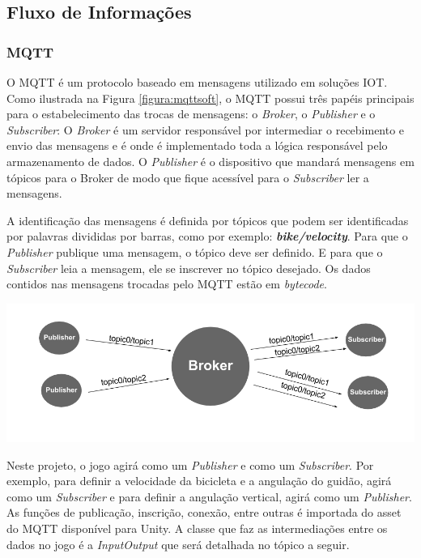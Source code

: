\subsection{Fluxo de Informa\c{c}ões}
\subsubsection{MQTT}

O MQTT é um protocolo baseado em mensagens utilizado em soluções IOT. Como ilustrada na Figura \ref{figura:mqttsoft}, o MQTT possui três papéis principais para o estabelecimento das trocas de mensagens: o \textit{Broker}, o \textit{Publisher} e o \textit{Subscriber}: O \textit{Broker} é um servidor responsável por intermediar o recebimento e envio das mensagens e é onde é implementado toda a lógica responsável pelo armazenamento de dados. O \textit{Publisher} é o dispositivo que mandará mensagens em tópicos para o Broker de modo que fique acessível para o \textit{Subscriber} ler a mensagens.

A identificação das mensagens é definida por tópicos que podem ser identificadas por palavras divididas por barras, como por exemplo: \textit{\textbf{bike/velocity}}. Para que o \textit{Publisher} publique uma mensagem, o tópico deve ser definido. E para que o \textit{Subscriber} leia a mensagem, ele se inscrever no tópico desejado. Os dados contidos nas mensagens trocadas pelo MQTT estão em \textit{bytecode}.

\begin{center}
	\includegraphics[scale=0.4]{figuras/MQTT}
	\label{figura:mqttsoft}
\end{center}


Neste projeto, o jogo agirá como um \textit{Publisher} e como um \textit{Subscriber}. Por exemplo, para definir a velocidade da bicicleta e a angulação do guidão, agirá como um \textit{Subscriber} e para definir a angulação vertical, agirá como um \textit{Publisher}. As funções de publicação, inscrição, conexão, entre outras é importada do asset do MQTT disponível para Unity.  A classe que faz as intermediações entre os dados no jogo é a \textit{InputOutput} que será detalhada no tópico a seguir.

